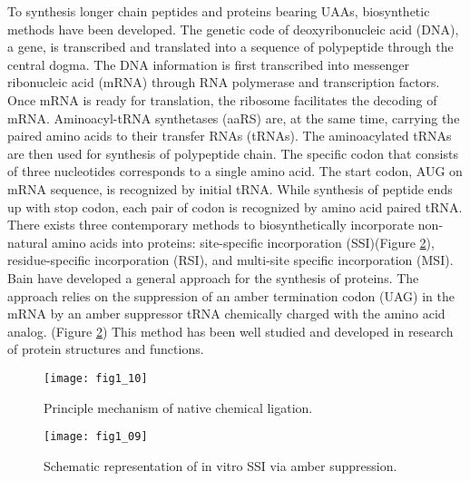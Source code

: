 \begin{refsection}
To synthesis longer chain
peptides and proteins bearing UAAs, biosynthetic methods have been developed.
The genetic code of deoxyribonucleic acid (DNA), a gene, is transcribed and
translated into a sequence of polypeptide through the central
dogma\cite{CRICK1970}. The DNA information is first transcribed into messenger
ribonucleic acid (mRNA) through RNA polymerase and transcription factors. Once
mRNA is ready for translation, the ribosome facilitates the decoding of mRNA.
Aminoacyl-tRNA synthetases (aaRS) are, at the same time, carrying the paired
amino acids to their transfer RNAs (tRNAs). The aminoacylated tRNAs are then
used for synthesis of polypeptide chain. The specific codon that consists of
three nucleotides corresponds to a single amino acid. The start codon, AUG on
mRNA sequence, is recognized by initial tRNA. While synthesis of peptide ends
up with stop codon, each pair of codon is recognized by amino acid paired
tRNA\cite{Sadava2006}. There exists three contemporary methods to
biosynthetically incorporate non-natural amino acids into proteins:
site-specific incorporation (SSI)(Figure \ref{fig:ssi-intro}), residue-specific
incorporation (RSI), and multi-site specific incorporation (MSI). Bain
 have developed a general approach for the 
synthesis of proteins\cite{Bain1991}.  The approach relies on the suppression
of an amber termination codon (UAG) in the mRNA by an amber suppressor tRNA
chemically charged with the amino acid analog.  (Figure \ref{fig:ssi-intro})
This method has been well studied and developed in research of protein
structures and functions\cite{Martoglio1995,Eichler1997}.
\begin{figure}[h!] \centering \texttt{[image: fig1\_10]}
    \caption[Princilple mechanism of native chemical ligation.]
    {Principle mechanism of native chemical ligation.} 
    \label{fig:ncl-intro} 
\end{figure}
\begin{figure}[h!] \centering \texttt{[image: fig1\_09]}
    \caption[Schematic representation of in vitro SSI via amber
    suppression.]{Schematic representation of in vitro SSI via amber
    suppression.} 
    \label{fig:ssi-intro} 
\end{figure}


\end{refsection}

